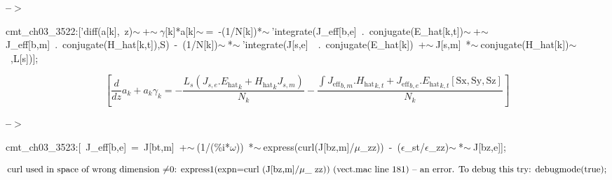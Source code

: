 \documentclass[fleqn]{article}
\begin{document}
\noindent
\begin{minipage}[t]{4.000000em}\color{red}\bfseries
 --\ensuremath{\ensuremath{>}}	
\end{minipage}
\begin{minipage}[t]{\textwidth}\color{blue}
cmt\_ch03\_3522:['diff(a[k],\ z)\ensuremath{\sim\ }+\ensuremath{\sim\ }\ensuremath{\gamma}[k]*a[k]\ensuremath{\sim\ }=\ -(1/N[k])*\ensuremath{\sim\ }'integrate(J\_eff[b,e]\ .\ conjugate(E\_hat[k,t])\ensuremath{\sim\ }+\ensuremath{\sim\ }J\_eff[b,m]\ .\ conjugate(H\_hat[k,t]),S)\ -\ (1/N[k])\ensuremath{\sim\ }*\ensuremath{\sim\ }'integrate(J[s,e]\ \ .\ conjugate(E\_hat[k])\ +\ensuremath{\sim\ }J[s,m]\ *\ensuremath{\sim\ }conjugate(H\_hat[k])\ensuremath{\sim\ }\ ,L[s])];
\end{minipage}
\[\displaystyle \tag{cmt\_ ch03\_ 3522} 
\left[ \frac{d}{d z} {a_k}+{a_k} {{\gamma }_k}=-\frac{{L_s} \left( {J_{s,e}}\ensuremath{\mathrm{ . }}{{{E_{\ensuremath{\mathrm{hat}}}}}_k}+{{{H_{\ensuremath{\mathrm{hat}}}}}_k} {J_{s,m}}\right) }{{N_k}}-\frac{\int {\left. {{{J_{\ensuremath{\mathrm{eff}}}}}_{b,m}}\ensuremath{\mathrm{ . }}{{{H_{\ensuremath{\mathrm{hat}}}}}_{k,t}}+{{{J_{\ensuremath{\mathrm{eff}}}}}_{b,e}}\ensuremath{\mathrm{ . }}{{{E_{\ensuremath{\mathrm{hat}}}}}_{k,t}}\left[ \ensuremath{\mathrm{Sx}}\operatorname{,}\ensuremath{\mathrm{Sy}}\operatorname{,}\ensuremath{\mathrm{Sz}}\right] \right.}}{{N_k}}\right] \mbox{}
\]


\noindent
\begin{minipage}[t]{4.000000em}\color{red}\bfseries
 --\ensuremath{\ensuremath{>}}	
\end{minipage}
\begin{minipage}[t]{\textwidth}\color{blue}
cmt\_ch03\_3523:[\ J\_eff[b,e]\ =\ J[bt,m]\ +\ensuremath{\sim\ }(1/(\%i*\ensuremath{\omega}))\ *\ensuremath{\sim\ }express(curl(J[bz,m]/\ensuremath{\mu}\_zz))\ -\ (\ensuremath{\epsilon}\_st/\ensuremath{\epsilon}\_zz)\ensuremath{\sim\ }*\ensuremath{\sim\ }J[bz,e]];
\end{minipage}
\[\displaystyle \mbox{%
curl used in space of wrong dimension
}\mbox{%
\ensuremath{\neq}0: express1(expn=curl (J[bz,m]/\ensuremath{\mu}\_ zz)) (vect.mac line 181)
}\mbox{%
 -- an error. To debug this try: debugmode(true);}\mbox{}
\]
\end{document}
